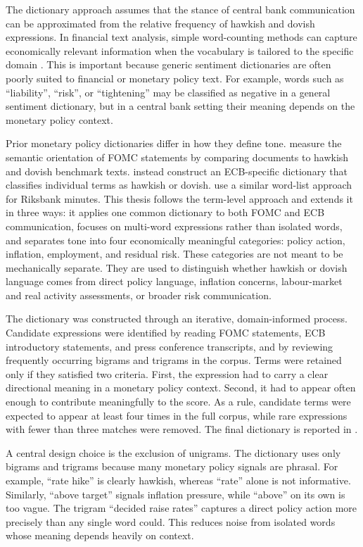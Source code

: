 The dictionary approach assumes that the stance of central bank
communication can be approximated from the relative frequency of
hawkish and dovish expressions. In financial text analysis, simple
word-counting methods can capture economically relevant information
when the vocabulary is tailored to the specific domain
\citep{tetlock2007,loughran2011}. This is important because generic
sentiment dictionaries are often poorly suited to financial or
monetary policy text. For example, words such as ``liability'',
``risk'', or ``tightening'' may be classified as negative in a
general sentiment dictionary, but in a central bank setting their
meaning depends on the monetary policy context.

Prior monetary policy dictionaries differ in how they define tone.
\citet{lucca2009} measure the semantic orientation of FOMC
statements by comparing documents to hawkish and dovish benchmark
texts. \citet{picault2017} instead construct an ECB-specific
dictionary that classifies individual terms as hawkish or dovish.
\citet{apel2014} use a similar word-list approach for Riksbank
minutes. This thesis follows the term-level approach and extends it
in three ways: it applies one common dictionary to both FOMC and ECB
communication, focuses on multi-word expressions rather than
isolated words, and separates tone into four economically meaningful
categories: policy action, inflation, employment, and residual risk.
These categories are not meant to be mechanically separate. They are
used to distinguish whether hawkish or dovish language comes from
direct policy language, inflation concerns, labour-market and real
activity assessments, or broader risk communication.

The dictionary was constructed through an iterative,
domain-informed process. Candidate expressions were identified by
reading FOMC statements, ECB introductory statements, and press
conference transcripts, and by reviewing frequently occurring
bigrams and trigrams in the corpus. Terms were retained only if they
satisfied two criteria. First, the expression had to carry a clear
directional meaning in a monetary policy context. Second, it had to
appear often enough to contribute meaningfully to the score. As a
rule, candidate terms were expected to appear at least four times in
the full corpus, while rare expressions with fewer than three
matches were removed. The final dictionary is reported in
.

A central design choice is the exclusion of unigrams. The dictionary
uses only bigrams and trigrams because many monetary policy signals
are phrasal. For example, ``rate hike'' is clearly hawkish, whereas
``rate'' alone is not informative. Similarly, ``above target''
signals inflation pressure, while ``above'' on its own is too vague.
The trigram ``decided raise rates'' captures a direct policy action
more precisely than any single word could. This reduces noise from
isolated words whose meaning depends heavily on context.

